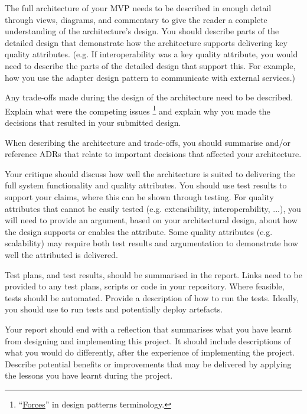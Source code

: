 \documentclass{csse4400}
\begin{document}
The full architecture of your MVP needs to be described in enough detail through views, diagrams, and commentary
to give the reader a complete understanding of the architecture's design.
You should describe parts of the detailed design that demonstrate how the architecture supports delivering key quality attributes.
(e.g. If interoperability was a key quality attribute, you would need to describe the parts of the detailed design that support this.
For example, how you use the adapter design pattern to communicate with external services.)

Any trade-offs made during the design of the architecture need to be described.
Explain what were the competing issues%
\footnote{``\href{http://www.cs.unc.edu/~stotts/COMP723-s15/patterns/forces.html}{Forces}'' in design patterns terminology.}
and explain why you made the decisions that resulted in your submitted design.

When describing the architecture and trade-offs,
you should summarise and/or reference ADRs that relate to important decisions that affected your architecture.

Your critique should discuss how well the architecture is suited to delivering the full system functionality and quality attributes.
You should use test results to support your claims, where this can be shown through testing.
For quality attributes that cannot be easily tested (e.g. extensibility, interoperability, ...),
you will need to provide an argument, based on your architectural design, about how the design supports or enables the attribute.
Some quality attributes (e.g. scalability) may require both test results
and argumentation to demonstrate how well the attributed is delivered.

Test plans, and test results, should be summarised in the report.
Links need to be provided to any test plans, scripts or code in your repository.
Where feasible, tests should be automated.
Provide a description of how to run the tests.
Ideally, you should use 
to run tests and potentially deploy artefacts.

Your report should end with a reflection that summarises what you have learnt from designing and implementing this project.
It should include descriptions of what you would do differently, after the experience of implementing the project.
Describe potential benefits or improvements that may be delivered by applying the lessons you have learnt during the project.
\end{document}
